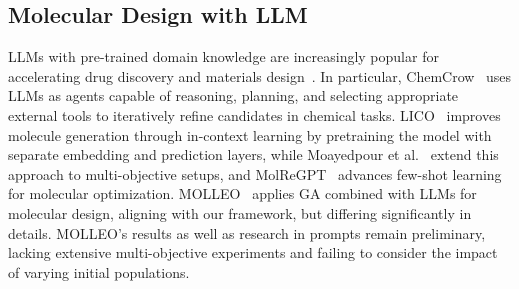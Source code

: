 \subsection{Molecular Design with LLM}
LLMs with pre-trained domain knowledge are increasingly popular for accelerating drug discovery and materials design~\cite{ai4science2023impact}. In particular, ChemCrow~\cite{2024chemcrow} uses LLMs as agents capable of reasoning, planning, and selecting appropriate external tools to iteratively refine candidates in chemical tasks. LICO~\cite{2024lico} improves molecule generation through in-context learning by pretraining the model with separate embedding and prediction layers, while Moayedpour et al.~\cite{2024many} extend this approach to multi-objective setups, and MolReGPT~\cite{li2024molReGPT} advances few-shot learning for molecular optimization. MOLLEO~\cite{molleo} applies GA combined with LLMs for molecular design, aligning with our framework, but differing significantly in details. MOLLEO's results as well as research in prompts remain preliminary, lacking extensive multi-objective experiments and failing to consider the impact of varying initial populations.